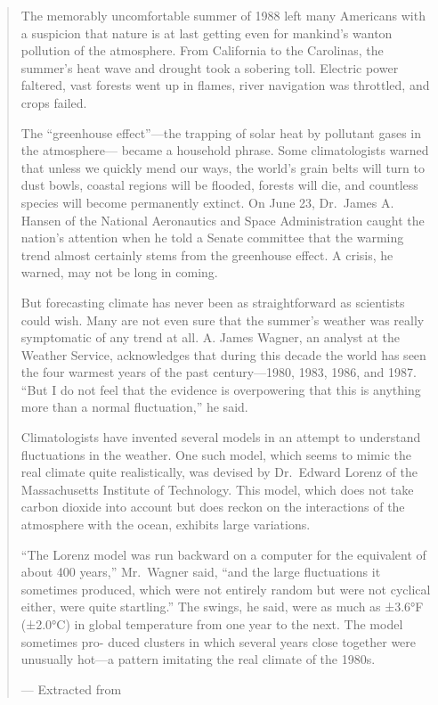 \documentclass[
  12pt,
]{book}
\begin{document}
\begin{quote}
The memorably uncomfortable summer of 1988 left many Americans with a suspicion that
nature is at last getting even for mankind's wanton pollution of the atmosphere. From
California to the Carolinas, the summer's heat wave and drought took a sobering toll.
Electric power faltered, vast forests went up in flames, river navigation was throttled, and
crops failed.

The ``greenhouse effect''---the trapping of solar heat by pollutant gases in the atmosphere---
became a household phrase. Some climatologists warned that unless we quickly mend our
ways, the world's grain belts will turn to dust bowls, coastal regions will be flooded, forests
will die, and countless species will become permanently extinct. On June 23, Dr.~James A.
Hansen of the National Aeronautics and Space Administration caught the nation's attention
when he told a Senate committee that the warming trend almost certainly stems from the
greenhouse effect. A crisis, he warned, may not be long in coming.

But forecasting climate has never been as straightforward as scientists could wish. Many are
not even sure that the summer's weather was really symptomatic of any trend at all. A. James
Wagner, an analyst at the Weather Service, acknowledges that during this decade the world has
seen the four warmest years of the past century---1980, 1983, 1986, and 1987. ``But I do not feel
that the evidence is overpowering that this is anything more than a normal fluctuation,'' he said.

Climatologists have invented several models in an attempt to understand fluctuations in
the weather. One such model, which seems to mimic the real climate quite realistically, was
devised by Dr.~Edward Lorenz of the Massachusetts Institute of Technology. This model,
which does not take carbon dioxide into account but does reckon on the interactions of the
atmosphere with the ocean, exhibits large variations.

``The Lorenz model was run backward on a computer for the equivalent of about 400
years,'' Mr.~Wagner said, ``and the large fluctuations it sometimes produced, which were not
entirely random but were not cyclical either, were quite startling.'' The swings, he said, were as
much as ±3.6°F (±2.0°C) in global temperature from one year to the next. The model sometimes pro-
duced clusters in which several years close together were unusually hot---a pattern imitating
the real climate of the 1980s.

--- Extracted from \citep{giere2006understanding}
\end{quote}
\end{document}
